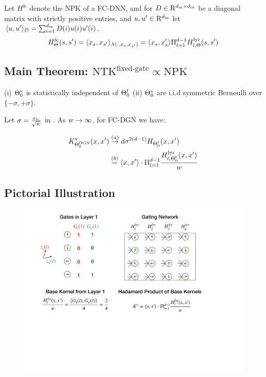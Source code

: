 \begin{lemma}\label{lm:productkernel}
 Let $H^{\text{fc}}$ denote the NPK of a FC-DNN, and for $D\in\mathrm{R}^{d_{\text{in}}\times d_{\text{in}}}$ be a diagonal matrix with strictly positive entries, and $u,u'\in\mathrm{R}^{d_{\text{in}}}$ let $\langle u,u'\rangle_{D}=\sum_{i=1}^{d_{\text{in}}}D(i)u(i)u'(i)$.
\begin{align*}
H^{\text{fc}}_{\Theta}(s,s')= \langle x_s,x_{s'}\rangle_{\Lambda(\cdot,x_s,x_{s'})}=\langle x_s,x_s'\rangle\Pi_{l=1}^{d-1}H^{\text{lyr}}_{l,\Theta}(s,s')\end{align*}
\end{lemma}


\subsection{Main Theorem: $\text{NTK}^{\text{fixed-gate}}\propto\text{NPK}$}
\begin{assumption}\label{assmp:main}
(i) ${\Theta}^{\text{v}}_0$ is statistically independent of $\Theta^{\textrm{f}}_0$ (ii) ${\Theta}^{\text{v}}_0$ are i.i.d symmetric Bernoulli over $\{-{\sigma},+{\sigma}\}$. 
\end{assumption}

\begin{theorem}\label{th:main} Let $\sigma=\frac{\sigma_{\text{fc}}}{\sqrt{w}}$ in . As $w\rightarrow\infty$, for FC-DGN we have: 

\begin{align*}
K^{\text{v}}_{\Theta^{\text{DGN}}_0}(x,x')&\stackrel{(a)}{\rightarrow} d \sigma^{2(d-1)} H_{\Theta^{\textrm{f}}_0}(x,x')\\ 
&\stackrel{(b)}= \langle x,x'\rangle\cdot \Pi_{l=1}^{d-1} \frac{H^{\text{lyr}}_{l,\Theta^{\textrm{f}}_0}(x,x')}{w}
\end{align*}

\end{theorem}
\subsection{Pictorial Illustration}
\FloatBarrier
\begin{figure}[h]
\centering
\includegraphics[scale=0.25]{figs/overall.pdf}
\end{figure}